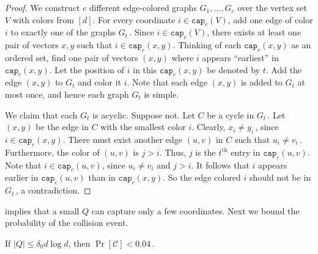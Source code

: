 \documentclass{toc}
\newcommand{\ord}[2][th]{\ensuremath{{#2}^{\mathrm{#1}}}}
\newcommand{\cC}{\ensuremath{\mathcal{C}}}
\newcommand{\lbconst}{\ensuremath{\delta_0}}
\newcommand{\capt}{\mathtt{cap}}
\newcommand{\Lem}[1]{\expref{Lemma}{lem:#1}}
\begin{document}
\begin{proof}
We construct $c$ different edge-colored graphs $G_1, \ldots, G_c$ over the vertex set $V$ with colors from $[d]$.
For every coordinate $i\in \capt_c(V)$, add one edge of color $i$ to exactly one of the graphs $G_t$\,. %
Since $i \in \capt_c(V)$, there exists at least one pair of
vectors $x,y$ such that $i \in \capt_c(x,y)$.
Thinking of each $\capt_c(x,y)$ as an ordered set, find one pair of vectors
$(x,y)$ where $i$ appears ``earliest'' in $\capt_c(x,y)$.
Let the position of $i$ in this $\capt_c(x,y)$ be denoted by $t$.
Add the edge $(x,y)$ to $G_t$ and color it $i$.
Note that each edge $(x,y)$ is added to $G_t$ at most once, and hence each graph $G_t$ is simple.

We claim that each $G_t$ is acyclic. Suppose not.
Let $C$ be a cycle in $G_t$\,. %
Let $(x,y)$ be the edge in $C$ with the smallest color $i$. 
Clearly, $x_i \neq y_i$\,, %
since $i \in \capt_c(x,y)$. There must exist another edge $(u,v)$ in $C$
such that $u_i \neq v_i$\,. %
Furthermore, the color of $(u,v)$
is $j > i$. Thus, $j$ is the $\ord{t}$ entry in $\capt_c(u,v)$.
Note that $i \in \capt_c(u,v)$,
since $u_i \neq v_i$ and $j > i$. It follows that $i$
appears earlier in $\capt_c(u,v)$ than in $\capt_c(x,y)$.
So the edge colored $i$ should not be in $G_t$\,, %
a contradiction.
\end{proof}

\Lem{comb} implies that a small $Q$ can capture only a few coordinates.
Next we bound the probability of the collision event.
%

\begin{lemma}\label{lem:collision}
If $|Q|\leq \lbconst d\log d$, then $\Pr[\cC] < 0.04$\,. %
%
\end{lemma}
\end{document}
